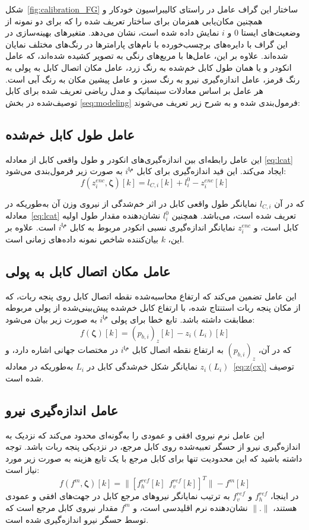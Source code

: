 شکل~\ref{fig:calibration_FG} ساختار این گراف عامل در راستای کالیبراسیون خودکار و همچنین مکان‌یابی همزمان برای ساختار تعریف شده را که برای دو نمونه از وضعیت‌های ایستا $0$ و $i$ نمایش داده شده است، نشان می‌دهد. متغیرهای بهینه‌سازی در این گراف با دایره‌های برچسب‌خورده با نام‌های پارامتر‌ها در رنگ‌های مختلف نمایان شده‌اند.
علاوه بر این، عامل‌ها با مربع‌های رنگی به تصویر کشیده شده‌اند، که عامل انکودر و یا همان طول کابل خم‌شده به رنگ زرد، عامل مکان اتصال کابل به پولی به رنگ قرمز، عامل اندازه‌گیری نیرو به رنگ سبز، و عامل پیشین مکان به رنگ آبی است. هر عامل بر اساس معادلات سینماتیک و مدل ریاضی تعریف شده برای کابل توصیف‌شده در بخش
\ref{seq:modeling}
 فرمول‌بندی شده و به شرح زیر تعریف می‌شوند:

\subsection{عامل طول کابل خم‌شده}
این عامل رابطه‌ای بین اندازه‌گیری‌های انکودر و طول واقعی کابل از معادله
\ref{eq:lcat}
 ایجاد می‌کند. این قید اندازه‌گیری برای کابل $i^{ام}$ به صورت زیر فرمول‌بندی می‌شود:
\begin{equation}
	f(z^{enc}_{i}, \bm{\zeta})[k] = l_{C,i}[k] + l^0_i - z^{enc}_{i}[k]
\end{equation}

که در آن $l_{C,i}$ نمایانگر طول واقعی کابل در اثر خم‌شدگی از نیروی وزن آن  به‌طوریکه در معادله~\ref{eq:lcat} تعریف شده است، می‌باشد. همچنین $l^0_i$ نشان‌دهنده مقدار طول اولیه کابل است، و $z^{enc}_{i}$ نمایانگر اندازه‌گیری نسبی انکودر مربوط به کابل $i^{ام}$ است. علاوه بر این، $k$ بیان‌کننده شاخص نمونه داده‌های زمانی است.

\subsection{عامل مکان اتصال کابل به پولی}
این عامل تضمین می‌کند که ارتفاع محاسبه‌شده نقطه اتصال کابل روی پنجه ربات، که از مکان پنجه ربات استنتاج شده، با ارتفاع کابل خم‌شده پیش‌بینی‌شده از پولی مربوطه مطابقت داشته باشد. تابع خطا برای پولی $i^{ام}$ به صورت زیر بیان می‌شود:
\begin{equation}
	f(\bm{\zeta})[k] = (p_{b,i})_z [k] - z_i(L_i)[k]
\end{equation}
که در آن، $(p_{b,i})_z$ به ارتفاع نقطه اتصال کابل $i^{ام}$ در مختصات جهانی اشاره دارد، و $z_i(L_i)$ نمایانگر شکل خم‌شدگی کابل در $L_i$ به‌طوریکه در معادله~\ref{eq:z(cx)} توصیف شده است.

\subsection{عامل اندازه‌گیری نیرو}
این عامل نرم نیروی افقی و عمودی را به‌گونه‌ای محدود می‌کند که نزدیک به اندازه‌گیری نیرو از حسگر تعبیه‌شده روی کابل مرجع، در نزدیکی پنجه ربات باشد. توجه داشته باشید که این محدودیت تنها برای کابل مرجع با یک تابع هزینه به صورت زیر مورد نیاز است:
\begin{equation}
	f(f^{m}, \bm{\zeta})[k] = \| [f^{ref}_{h}[k]~~f^{ref}_{v}[k]]^T \| - f^{m}[k]
\end{equation}
در اینجا، $f^{ref}_{h}$ و $f^{ref}_{v}$ به ترتیب نمایانگر نیروهای مرجع کابل در جهت‌های افقی و عمودی هستند، $\|.\|$ نشان‌دهنده نرم اقلیدسی است، و $f^{m}$ مقدار  نیروی کابل مرجع است که توسط حسگر نیرو اندازه‌گیری شده است.

